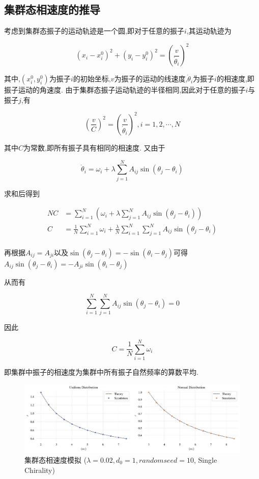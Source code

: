 \documentclass{article}
\begin{document}
\subsection{集群态相速度的推导}

考虑到集群态振子的运动轨迹是一个圆,即对于任意的振子$i$,其运动轨迹为

$$
\left( x_i-x_{i}^{0} \right) ^2+\left( y_i-y_{i}^{0} \right) ^2=\left( \frac{v}{\dot{\theta}_i} \right) ^2
$$

其中,$\left( x_{i}^{0},y_{i}^{0} \right)$为振子$i$的初始坐标,$v$为振子的运动的线速度,$\dot{\theta}_i$为振子$i$的相速度,即振子运动的角速度. 由于集群态振子运动轨迹的半径相同,因此对于任意的振子$i$与振子$j$,有

$$
\left( \frac{v}{C} \right) ^2=\left( \frac{v}{\dot{\theta}_i} \right) ^2,i=1,2,\cdots ,N
$$

其中$C$为常数,即所有振子具有相同的相速度. 又由于

$$
\dot{\theta}_i=\omega _i+\lambda \sum_{j=1}^N{A_{ij}\sin \left( \theta _j-\theta _i \right)}
$$

求和后得到
\vspace{-0.5cm}

$$
\begin{aligned}
	NC&=\sum_{i=1}^N{\left( \omega _i+\lambda \sum_{j=1}^N{A_{ij}\sin \left( \theta _j-\theta _i \right)} \right)}\\
	C&=\frac{1}{N}\sum_{i=1}^N{\omega _i}+\frac{\lambda}{N}\sum_{i=1}^N{\sum_{j=1}^N{A_{ij}\sin \left( \theta _j-\theta _i \right)}}\\
\end{aligned}
$$

再根据$A_{ij}=A_{ji}$以及$\sin \left( \theta _j-\theta _i \right)=-\sin \left( \theta _i-\theta _j \right)$可得$
A_{ij}\sin \left( \theta _j-\theta _i \right) =-A_{ji}\sin \left( \theta _i-\theta _j \right) 
$

从而有

$$
\sum_{i=1}^N{\sum_{j=1}^N{A_{ij}\sin \left( \theta _j-\theta _i \right)}}=0
$$

因此
\vspace{-0.5cm}

\begin{equation}\label{eq:eq2.2.1}
	C=\frac{1}{N}\sum_{i=1}^N{\omega _i}
\end{equation}

即集群中振子的相速度为集群中所有振子自然频率的算数平均.

\begin{figure}[H]
	\centering
	\includegraphics[width=\textwidth]{./figs/swarmRadiusSimu.png}
	\vspace{-1cm}
	\caption{集群态相速度模拟 ($\lambda=0.02, d_0=1, random seed=10$, Single Chirality)}
	\label{fig:fig22}
\end{figure}
\end{document}
